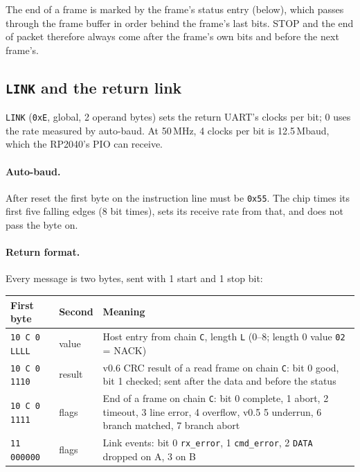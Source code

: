 \documentclass[11pt,a4paper]{article}
\newcommand{\vfive}{\textcolor{fivec}{\textsf{\small v0.5}}}
\newcommand{\vsix}{\textcolor{sixc}{\textsf{\small v0.6}}}
\newcommand{\sig}[1]{\texttt{#1}}
\begin{document}
The end of a frame is marked by the frame's status entry (below), which passes through the frame buffer in order behind the frame's last bits. STOP and the end of packet therefore always come after the frame's own bits and before the next frame's.

\subsection{\sig{LINK} and the return link}

\sig{LINK} (\texttt{0xE}, global, 2 operand bytes) sets the return UART's clocks per bit; 0 uses the rate measured by auto-baud. At 50\,MHz, 4 clocks per bit is 12.5\,Mbaud, which the RP2040's PIO can receive.

\paragraph{Auto-baud.} After reset the first byte on the instruction line must be \texttt{0x55}. The chip times its first five falling edges (8 bit times), sets its receive rate from that, and does not pass the byte on.

\paragraph{Return format.} Every message is two bytes, sent with 1 start and 1 stop bit:
\begin{center}
\begin{tabularx}{\linewidth}{@{}l l >{\raggedright\arraybackslash}X@{}}
\toprule
First byte & Second & Meaning \\
\midrule
\texttt{10 C 0 LLLL} & value & Host entry from chain \texttt{C}, length \texttt{L} (0--8; length 0 value \texttt{02} = NACK) \\
\texttt{10 C 0 1110} & result & \vsix{} CRC result of a read frame on chain \texttt{C}: bit 0 good, bit 1 checked; sent after the data and before the status \\
\texttt{10 C 0 1111} & flags & End of a frame on chain \texttt{C}: bit 0 complete, 1 abort, 2 timeout, 3 line error, 4 overflow, \vfive{} 5 underrun, 6 branch matched, 7 branch abort \\
\texttt{11 000000} & flags & Link events: bit 0 \sig{rx\_error}, 1 \sig{cmd\_error}, 2 \sig{DATA} dropped on A, 3 on B \\
\bottomrule
\end{tabularx}
\end{center}
\end{document}
